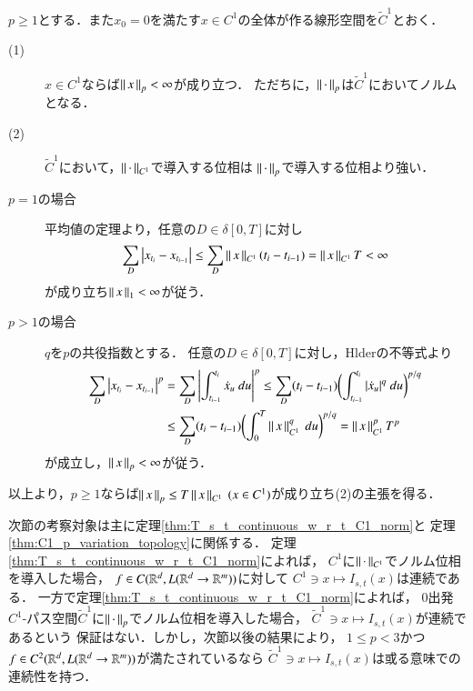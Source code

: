\begin{screen}
	\begin{thm}\label{thm:C1_p_variation_topology}
		$p \geq 1$とする．また$x_0 = 0$を満たす$x \in C^1$の全体が作る線形空間を$\tilde{C}^1$とおく．
		\begin{description}
			\item[(1)] $x \in C^1$ならば$\left\|\, x\, \right\|_{p} < \infty$が成り立つ．
				ただちに，$\left\|\, \cdot\, \right\|_{p}$は$\tilde{C}^1$においてノルムとなる．
			\item[(2)] $\tilde{C}^1$において，$\left\|\, \cdot\, \right\|_{C^1}$で導入する位相は
				$\left\|\, \cdot\, \right\|_{p}$で導入する位相より強い．
		\end{description}
	\end{thm}
\end{screen}

\begin{prf}\mbox{}
	\begin{description}
		\item[$p = 1$の場合]
			平均値の定理より，任意の$D \in \delta[0,T]$に対し
			\begin{align}
				\sum_D \left| x_{t_i} - x_{t_{i-1}} \right|
				\leq \sum_D \left\|\, x\, \right\|_{C^1}(t_i - t_{i-1})
				= \left\|\, x\, \right\|_{C^1}T < \infty
			\end{align}
			が成り立ち$\left\|\, x\, \right\|_{1} < \infty$が従う．
		
		\item[$p > 1$の場合] $q$を$p$の共役指数とする．
			任意の$D \in \delta[0,T]$に対し，Hlderの不等式より
			\begin{align}
				\sum_D \left| x_{t_i} - x_{t_{i-1}} \right|^p
				&= \sum_D \left| \int_{t_{i-1}}^{t_i} \dot{x}_{u}\ du \right|^p 
				\leq \sum_D (t_i - t_{i-1})
					\biggl( \int_{t_{i-1}}^{t_i} | \dot{x}_{u} |^q\ du \biggr)^{p/q} \\
				&\leq \sum_D (t_i - t_{i-1})
					\biggl(\int_{0}^{T} \Norm{x}{C^1}^q\ du \biggr)^{p/q}
				= \Norm{x}{C^1}^p T^p
			\end{align}
			が成立し，$\left\|\, x\, \right\|_{p} < \infty$が従う．
	\end{description}
	以上より，$p \geq 1$ならば$\left\|\, x\, \right\|_{p} \leq T\left\|\, x\, \right\|_{C^1}\ (x \in C^1)$が成り立ち(2)の主張を得る．
	\QED
\end{prf}

	次節の考察対象は主に定理\ref{thm:T_s_t_continuous_w_r_t_C1_norm}と
	定理\ref{thm:C1_p_variation_topology}に関係する．
	定理\ref{thm:T_s_t_continuous_w_r_t_C1_norm}によれば，
	$C^1$に$\left\|\, \cdot\, \right\|_{C^1}$でノルム位相を導入した場合，
	$f \in C(\mathbb{R}^d,L(\mathbb{R}^d \rightarrow \mathbb{R}^m))$に対して
	$C^1 \ni x \longmapsto I_{s,t}(x)$は連続である．
	一方で定理\ref{thm:T_s_t_continuous_w_r_t_C1_norm}によれば，
	0出発$C^1$-パス空間$\tilde{C}^1$に$\left\|\, \cdot\, \right\|_{p}$でノルム位相を導入した場合，
	$\tilde{C}^1 \ni x \longmapsto I_{s,t}(x)$が連続であるという
	保証はない．しかし，次節以後の結果により，
	$1 \leq p < 3$かつ$f \in C^2(\mathbb{R}^d,L(\mathbb{R}^d \rightarrow \mathbb{R}^m))$が満たされているなら
	$\tilde{C}^1 \ni x \longmapsto I_{s,t}(x)$は或る意味での連続性を持つ．
